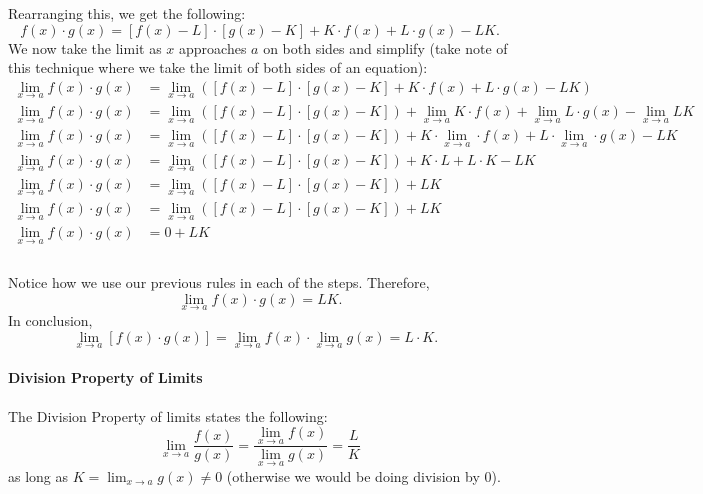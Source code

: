 \documentclass{article}
\begin{document}
Rearranging this, we get the following:
\[f(x)\cdot g(x) = [f(x)-L]\cdot [g(x)-K] + K\cdot f(x) + L\cdot g(x) - LK.\]
We now take the limit as $x$ approaches $a$ on both sides and simplify (take note of this technique where we take the limit of both sides of an equation):
\begin{align*}
    \lim_{x\to a} f(x)\cdot g(x) &= \lim_{x\to a} \left([f(x)-L]\cdot [g(x)-K] + K\cdot f(x) + L\cdot g(x) - LK\right) \\
    \lim_{x\to a} f(x)\cdot g(x) &= \lim_{x\to a} \left([f(x)-L]\cdot [g(x)-K]\right) + \lim_{x\to a} K\cdot f(x) + \lim_{x\to a} L\cdot g(x) - \lim_{x\to a} LK \\
    \lim_{x\to a} f(x)\cdot g(x) &= \lim_{x\to a} \left([f(x)-L]\cdot [g(x)-K]\right) + K\cdot \lim_{x\to a} \cdot f(x) + L\cdot \lim_{x\to a} \cdot g(x) - LK \\
    \lim_{x\to a} f(x)\cdot g(x) &= \lim_{x\to a} \left([f(x)-L]\cdot [g(x)-K]\right) + K\cdot L + L\cdot K - LK \\
    \lim_{x\to a} f(x)\cdot g(x) &= \lim_{x\to a} \left([f(x)-L]\cdot [g(x)-K]\right) + LK \\
    \lim_{x\to a} f(x)\cdot g(x) &= \lim_{x\to a} \left([f(x)-L]\cdot [g(x)-K]\right) + LK \\
    \lim_{x\to a} f(x)\cdot g(x) &= 0 + LK \\
\end{align*}
\\
Notice how we use our previous rules in each of the steps. Therefore, 
\[\lim_{x\to a} f(x)\cdot g(x) = LK.\]
In conclusion,
\[\lim_{x\to a}[f(x)\cdot g(x)]=\lim_{x\to a}f(x) \cdot \lim_{x\to a}g(x)=L\cdot K.\text{ }\boxed{}\]

\paragraph{Division Property of Limits} The Division Property of limits states the following:
\[\lim_{x\to a}\frac{f(x)}{g(x)}=\frac{\lim_{x\to a}f(x)}{\lim_{x\to a}g(x)}=\frac{L}{K}\]
as long as $K=\lim_{x\to a} g(x)\neq 0$ (otherwise we would be doing division by 0).
\end{document}
